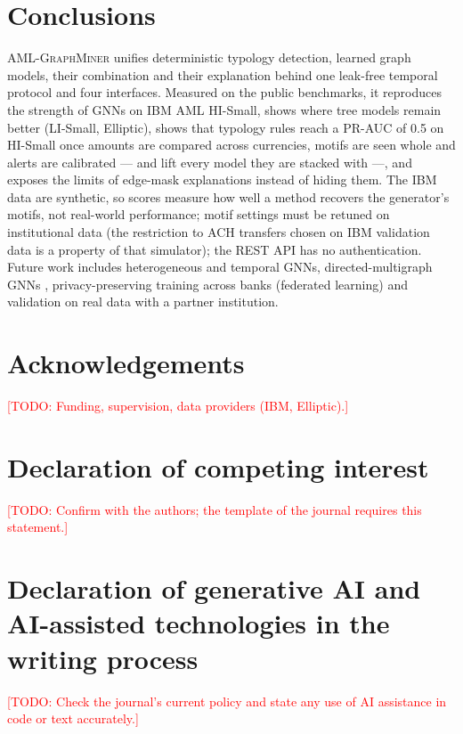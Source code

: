 \documentclass[review,12pt]{elsarticle}%
\newcommand{\todo}[1]{\textcolor{red}{[TODO: #1]}}
\newcommand{\amlgm}{\textsc{AML-GraphMiner}}
\begin{document}
\section{Conclusions}

\amlgm{} unifies deterministic typology detection, learned graph models, their combination and
their explanation behind one leak-free temporal protocol and four interfaces. Measured on the public
benchmarks, it reproduces the strength of GNNs on IBM AML HI-Small, shows where tree models remain
better (LI-Small, Elliptic), shows that typology rules reach a PR-AUC of 0.5 on HI-Small once
amounts are compared across currencies, motifs are seen whole and alerts are calibrated --- and
lift every model they are stacked with ---, and
exposes the limits of edge-mask explanations instead of hiding them. The IBM data are synthetic, so scores measure how well a
method recovers the generator's motifs, not real-world performance; motif settings must be retuned
on institutional data (the restriction to ACH transfers chosen on IBM validation data is a property
of that simulator); the REST API has no authentication. Future work includes heterogeneous and
temporal GNNs, directed-multigraph GNNs \cite{egressy2024provably}, privacy-preserving training
across banks (federated learning) and validation on real data with a partner institution.

\section*{Acknowledgements}
\todo{Funding, supervision, data providers (IBM, Elliptic).}

\section*{Declaration of competing interest}
\todo{Confirm with the authors; the template of the journal requires this statement.}

\section*{Declaration of generative AI and AI-assisted technologies in the writing process}
\todo{Check the journal's current policy and state any use of AI assistance in code or text accurately.}


\end{document}
